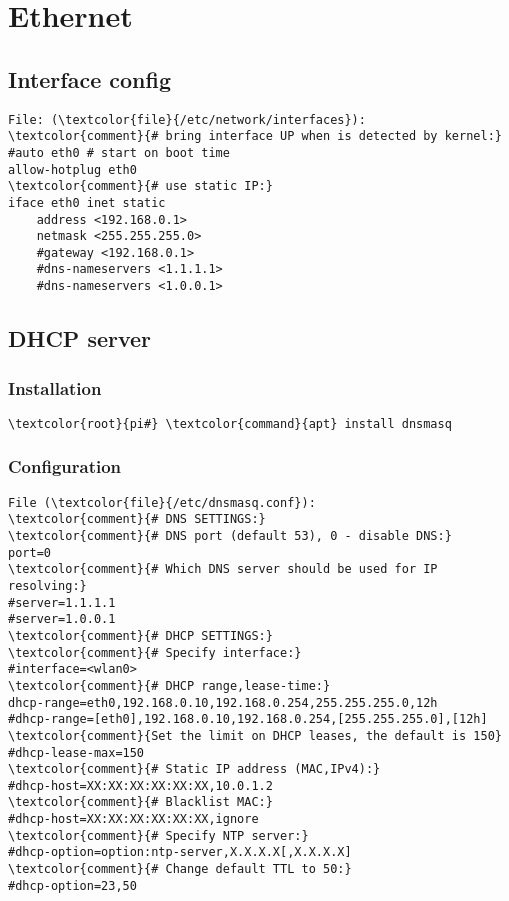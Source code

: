 \documentclass[10pt, a4paper, onecolumn, openany]{book} %
\begin{document}
\section{Ethernet}
\subsection{Interface config}
\begin{Verbatim}[commandchars=\\\{\}]
File: (\textcolor{file}{/etc/network/interfaces}):
\textcolor{comment}{# bring interface UP when is detected by kernel:}
#auto eth0 # start on boot time
allow-hotplug eth0
\textcolor{comment}{# use static IP:}
iface eth0 inet static
    address <192.168.0.1>
    netmask <255.255.255.0>
    #gateway <192.168.0.1>
    #dns-nameservers <1.1.1.1>
    #dns-nameservers <1.0.0.1>
\end{Verbatim}

\subsection{DHCP server}
\subsubsection{Installation}
\begin{Verbatim}[commandchars=\\\{\}]
    \textcolor{root}{pi#} \textcolor{command}{apt} install dnsmasq
\end{Verbatim}

\subsubsection{Configuration}
\begin{Verbatim}[commandchars=\\\{\}]
File (\textcolor{file}{/etc/dnsmasq.conf}):
\textcolor{comment}{# DNS SETTINGS:}
\textcolor{comment}{# DNS port (default 53), 0 - disable DNS:}
port=0
\textcolor{comment}{# Which DNS server should be used for IP resolving:}
#server=1.1.1.1
#server=1.0.0.1
\textcolor{comment}{# DHCP SETTINGS:}
\textcolor{comment}{# Specify interface:}
#interface=<wlan0>
\textcolor{comment}{# DHCP range,lease-time:}
dhcp-range=eth0,192.168.0.10,192.168.0.254,255.255.255.0,12h
#dhcp-range=[eth0],192.168.0.10,192.168.0.254,[255.255.255.0],[12h]
\textcolor{comment}{Set the limit on DHCP leases, the default is 150}
#dhcp-lease-max=150
\textcolor{comment}{# Static IP address (MAC,IPv4):}
#dhcp-host=XX:XX:XX:XX:XX:XX,10.0.1.2
\textcolor{comment}{# Blacklist MAC:}
#dhcp-host=XX:XX:XX:XX:XX:XX,ignore
\textcolor{comment}{# Specify NTP server:}
#dhcp-option=option:ntp-server,X.X.X.X[,X.X.X.X]
\textcolor{comment}{# Change default TTL to 50:}
#dhcp-option=23,50
\end{Verbatim}
\end{document}
